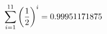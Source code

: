 \documentclass[preview]{standalone}
\begin{document}
\begin{align*}
\sum_{i=1}^{ 11 } \left({ 1 } \over {2} \right)^i = { 0.99951171875 }
\end{align*}
\end{document}
